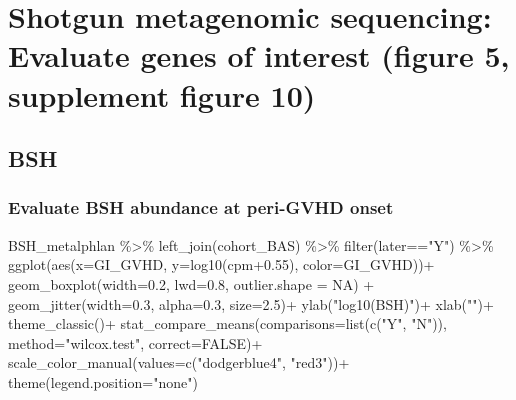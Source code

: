 \documentclass[
]{book}
\newenvironment{Shaded}{\begin{snugshade}}{\end{snugshade}}
\newcommand{\AttributeTok}[1]{\textcolor[rgb]{0.77,0.63,0.00}{#1}}
\newcommand{\ConstantTok}[1]{\textcolor[rgb]{0.00,0.00,0.00}{#1}}
\newcommand{\FloatTok}[1]{\textcolor[rgb]{0.00,0.00,0.81}{#1}}
\newcommand{\FunctionTok}[1]{\textcolor[rgb]{0.00,0.00,0.00}{#1}}
\newcommand{\NormalTok}[1]{#1}
\newcommand{\SpecialCharTok}[1]{\textcolor[rgb]{0.00,0.00,0.00}{#1}}
\newcommand{\StringTok}[1]{\textcolor[rgb]{0.31,0.60,0.02}{#1}}
\begin{document}
\hypertarget{shotgun-metagenomic-sequencing-evaluate-genes-of-interest-figure-5-supplement-figure-10}{%
\chapter{Shotgun metagenomic sequencing: Evaluate genes of interest (figure 5, supplement figure 10)}\label{shotgun-metagenomic-sequencing-evaluate-genes-of-interest-figure-5-supplement-figure-10}}

\hypertarget{bsh}{%
\section{BSH}\label{bsh}}

\hypertarget{evaluate-bsh-abundance-at-peri-gvhd-onset}{%
\subsection{Evaluate BSH abundance at peri-GVHD onset}\label{evaluate-bsh-abundance-at-peri-gvhd-onset}}

\begin{Shaded}
\begin{Highlighting}[]
\NormalTok{BSH\_metalphlan }\SpecialCharTok{\%\textgreater{}\%} 
  \FunctionTok{left\_join}\NormalTok{(cohort\_BAS) }\SpecialCharTok{\%\textgreater{}\%} 
  \FunctionTok{filter}\NormalTok{(later}\SpecialCharTok{==}\StringTok{"Y"}\NormalTok{) }\SpecialCharTok{\%\textgreater{}\%} 
  \FunctionTok{ggplot}\NormalTok{(}\FunctionTok{aes}\NormalTok{(}\AttributeTok{x=}\NormalTok{GI\_GVHD, }\AttributeTok{y=}\FunctionTok{log10}\NormalTok{(cpm}\FloatTok{+0.55}\NormalTok{), }\AttributeTok{color=}\NormalTok{GI\_GVHD))}\SpecialCharTok{+}
  \FunctionTok{geom\_boxplot}\NormalTok{(}\AttributeTok{width=}\FloatTok{0.2}\NormalTok{, }\AttributeTok{lwd=}\FloatTok{0.8}\NormalTok{, }\AttributeTok{outlier.shape =} \ConstantTok{NA}\NormalTok{) }\SpecialCharTok{+}
  \FunctionTok{geom\_jitter}\NormalTok{(}\AttributeTok{width=}\FloatTok{0.3}\NormalTok{, }\AttributeTok{alpha=}\FloatTok{0.3}\NormalTok{, }\AttributeTok{size=}\FloatTok{2.5}\NormalTok{)}\SpecialCharTok{+}
  \FunctionTok{ylab}\NormalTok{(}\StringTok{"log10(BSH)"}\NormalTok{)}\SpecialCharTok{+}
  \FunctionTok{xlab}\NormalTok{(}\StringTok{""}\NormalTok{)}\SpecialCharTok{+}
  \FunctionTok{theme\_classic}\NormalTok{()}\SpecialCharTok{+}
  \FunctionTok{stat\_compare\_means}\NormalTok{(}\AttributeTok{comparisons=}\FunctionTok{list}\NormalTok{(}\FunctionTok{c}\NormalTok{(}\StringTok{"Y"}\NormalTok{, }\StringTok{"N"}\NormalTok{)),}
                     \AttributeTok{method=}\StringTok{"wilcox.test"}\NormalTok{,}
                     \AttributeTok{correct=}\ConstantTok{FALSE}\NormalTok{)}\SpecialCharTok{+}
  \FunctionTok{scale\_color\_manual}\NormalTok{(}\AttributeTok{values=}\FunctionTok{c}\NormalTok{(}\StringTok{"dodgerblue4"}\NormalTok{, }\StringTok{"red3"}\NormalTok{))}\SpecialCharTok{+}
  \FunctionTok{theme}\NormalTok{(}\AttributeTok{legend.position=}\StringTok{"none"}\NormalTok{)}
\end{Highlighting}
\end{Shaded}
\end{document}
